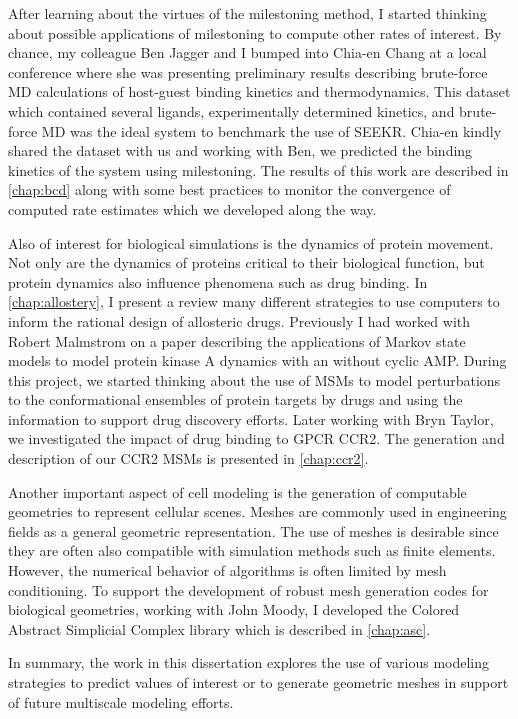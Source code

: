 \par After learning about the virtues of the milestoning method, I started thinking about possible applications of milestoning to compute other rates of interest.
By chance, my colleague Ben Jagger and I bumped into Chia-en Chang at a local conference where she was presenting preliminary results describing brute-force MD calculations of host-guest binding kinetics and thermodynamics\cite{Tang2017}.
This dataset which contained several ligands, experimentally determined kinetics, and brute-force MD was the ideal system to benchmark the use of SEEKR\cite{Votapka2017c}.
Chia-en kindly shared the dataset with us and working with Ben, we predicted the binding kinetics of the system using milestoning.
The results of this work are described in \cref{chap:bcd} along with some best practices to monitor the convergence of computed rate estimates which we developed along the way.

\par Also of interest for biological simulations is the dynamics of protein movement.
Not only are the dynamics of proteins critical to their biological function, but protein dynamics also influence phenomena such as drug binding.
In \cref{chap:allostery}, I present a review many different strategies to use computers to inform the rational design of allosteric drugs.
Previously I had worked with Robert Malmstrom on a paper describing the applications of Markov state models to model protein kinase A dynamics with an without cyclic AMP\cite{Malmstrom2015a}.
During this project, we started thinking about the use of MSMs to model perturbations to the conformational ensembles of protein targets by drugs and using the information to support drug discovery efforts.
Later working with Bryn Taylor, we investigated the impact of drug binding to GPCR CCR2.
The generation and description of our CCR2 MSMs is presented in \cref{chap:ccr2}.

\par Another important aspect of cell modeling is the generation of computable geometries to represent cellular scenes.
Meshes are commonly used in engineering fields as a general geometric representation.
The use of meshes is desirable since they are often also compatible with simulation methods such as finite elements.
However, the numerical behavior of algorithms is often limited by mesh conditioning.
To support the development of robust mesh generation codes for biological geometries, working with John Moody, I developed the Colored Abstract Simplicial Complex library which is described in \cref{chap:asc}.

\par In summary, the work in this dissertation explores the use of various modeling strategies to predict values of interest or to generate geometric meshes in support of future multiscale modeling efforts.

